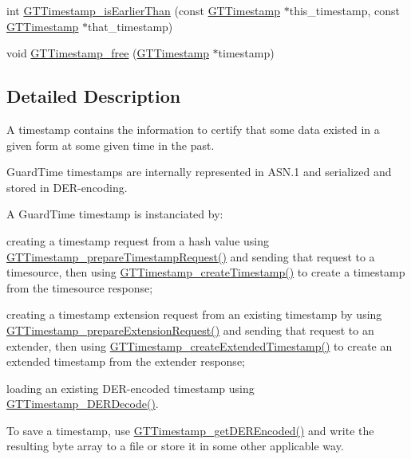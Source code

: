 \begin{DoxyCompactItemize}
\item 
int \hyperlink{group__timestamps_gacca559dbe52467feed1df7d0c3aad4fb}{GTTimestamp\_\-isEarlierThan} (const \hyperlink{group__timestamps_gaddb792efe52216386853c94e7aeaf6ba}{GTTimestamp} $\ast$this\_\-timestamp, const \hyperlink{group__timestamps_gaddb792efe52216386853c94e7aeaf6ba}{GTTimestamp} $\ast$that\_\-timestamp)
\item 
void \hyperlink{group__timestamps_gab765221df505f63b2155c08a63c62c0f}{GTTimestamp\_\-free} (\hyperlink{group__timestamps_gaddb792efe52216386853c94e7aeaf6ba}{GTTimestamp} $\ast$timestamp)
\end{DoxyCompactItemize}


\subsection{Detailed Description}
A timestamp contains the information to certify that some data existed in a given form at some given time in the past.

GuardTime timestamps are internally represented in ASN.1 and serialized and stored in DER-\/encoding.

A GuardTime timestamp is instanciated by:
\begin{DoxyItemize}
\item creating a timestamp request from a hash value using \hyperlink{group__timestamps_gabff8b301b58b0ce0602b128e4bac05f6}{GTTimestamp\_\-prepareTimestampRequest()} and sending that request to a timesource, then using \hyperlink{group__timestamps_ga135b81ff9a23081b3438c224f7388424}{GTTimestamp\_\-createTimestamp()} to create a timestamp from the timesource response;
\item creating a timestamp extension request from an existing timestamp by using \hyperlink{group__timestamps_ga983d529528937553b716168b57aa29ee}{GTTimestamp\_\-prepareExtensionRequest()} and sending that request to an extender, then using \hyperlink{group__timestamps_ga472426871678c08c1a4ad00bbb43efc7}{GTTimestamp\_\-createExtendedTimestamp()} to create an extended timestamp from the extender response;
\item loading an existing DER-\/encoded timestamp using \hyperlink{group__timestamps_ga3215673483c473abcf6fe7dd6b7151b2}{GTTimestamp\_\-DERDecode()}.
\end{DoxyItemize}

To save a timestamp, use \hyperlink{group__timestamps_ga58dca66e7a9b95b22d65fba870b23b7c}{GTTimestamp\_\-getDEREncoded()} and write the resulting byte array to a file or store it in some other applicable way.

